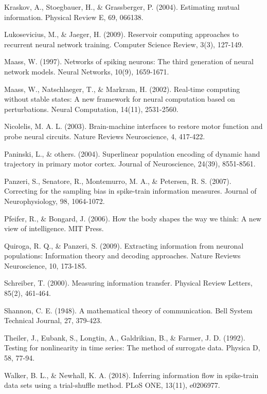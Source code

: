 \documentclass[12pt]{article}
\begin{document}
\noindent Kraskov, A., Stoegbauer, H., \& Grassberger, P. (2004). Estimating mutual information. Physical Review E, 69, 066138.
\par

\noindent Lukosevicius, M., \& Jaeger, H. (2009). Reservoir computing approaches to recurrent neural network training. Computer Science Review, 3(3), 127-149.
\par

\noindent Maass, W. (1997). Networks of spiking neurons: The third generation of neural network models. Neural Networks, 10(9), 1659-1671.
\par

\noindent Maass, W., Natschlaeger, T., \& Markram, H. (2002). Real-time computing without stable states: A new framework for neural computation based on perturbations. Neural Computation, 14(11), 2531-2560.
\par

\noindent Nicolelis, M. A. L. (2003). Brain-machine interfaces to restore motor function and probe neural circuits. Nature Reviews Neuroscience, 4, 417-422.
\par

\noindent Paninski, L., \& others. (2004). Superlinear population encoding of dynamic hand trajectory in primary motor cortex. Journal of Neuroscience, 24(39), 8551-8561.
\par

\noindent Panzeri, S., Senatore, R., Montemurro, M. A., \& Petersen, R. S. (2007). Correcting for the sampling bias in spike-train information measures. Journal of Neurophysiology, 98, 1064-1072.
\par

\noindent Pfeifer, R., \& Bongard, J. (2006). How the body shapes the way we think: A new view of intelligence. MIT Press.
\par

\noindent Quiroga, R. Q., \& Panzeri, S. (2009). Extracting information from neuronal populations: Information theory and decoding approaches. Nature Reviews Neuroscience, 10, 173-185.
\par

\noindent Schreiber, T. (2000). Measuring information transfer. Physical Review Letters, 85(2), 461-464.
\par

\noindent Shannon, C. E. (1948). A mathematical theory of communication. Bell System Technical Journal, 27, 379-423.
\par

\noindent Theiler, J., Eubank, S., Longtin, A., Galdrikian, B., \& Farmer, J. D. (1992). Testing for nonlinearity in time series: The method of surrogate data. Physica D, 58, 77-94.
\par

\noindent Walker, B. L., \& Newhall, K. A. (2018). Inferring information flow in spike-train data sets using a trial-shuffle method. PLoS ONE, 13(11), e0206977.
\par
\end{document}
